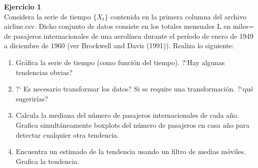 \documentclass[a4paper, 11pt]{article}
\newenvironment{problem}[2][Ejercicio]
{ \begin{mdframed}[backgroundcolor= red!50] \textbf{#1 #2} \\}
	{  \end{mdframed}}
\begin{document}
	\setlength{\parskip}{\medskipamount}
	\setlength{\parindent}{0pt}
\begin{problem}{1}
    Considera la serie de tiempo $\{X_t\}$ contenida en la primera columna del archivo airline.csv. Dicho conjunto de datos consiste en los totales mensuales L en miles= de pasajeros internacionales de una aerolínea durante el período de enero de 1949 a diciembre de 1960 (ver Brockwell and Davis (1991)). Realiza lo siguiente: 
    \begin{enumerate}
        \item Gráfica la serie de tiempo (como función del tiempo). ?`Hay algunas tendencias obvias?
        \item ?` Es necesario transformar los datos? Si se require una transformación. ?`qué sugerirías?
        \item Calcula la mediana del número de pasajeros internacionales de cada año. Grafica simultáneamente boxplots del número de pasajeros en casa año para detectar cualquier otra tendencia. 
        \item Encuentra un estimado de la tendencia usando un filtro de medias móviles. Grafica la tendencia.
    \end{enumerate}
\end{problem}
\end{document}
